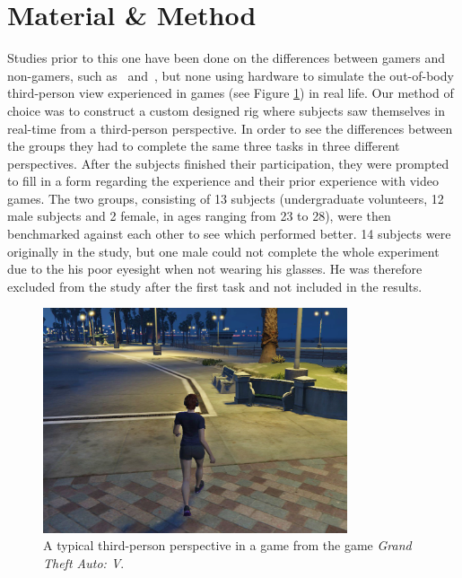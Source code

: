 \documentclass[runningheads,a4paper,oribibl]{llncs}
\begin{document}

\section{Material \& Method}
Studies prior to this one have been done on the differences between gamers and non-gamers, such as~\cite{schmierbach2011exploring} and~\cite{gong2015enhanced}, but none using hardware to simulate the out-of-body third-person view experienced in games (see Figure \ref{fig:GTAIV}) in real life. Our method of choice was to construct a custom designed rig where subjects saw themselves in real-time from a third-person perspective. In order to see the differences between the groups they had to complete the same three tasks in three different perspectives. After the subjects finished their participation, they were prompted to fill in a form regarding the experience and their prior experience with video games. The two groups, consisting of 13 subjects (undergraduate volunteers, 12 male subjects and 2 female, in ages ranging from 23 to 28), were then benchmarked against each other to see which performed better. 14 subjects were originally in the study, but one male could not complete the whole experiment due to the his poor eyesight when not wearing his glasses. He was therefore excluded from the study after the first task and not included in the results.




\begin{figure}
   \centering
   \includegraphics[width=0.8\textwidth]{ExternalMaterial/GTA}
   \caption{A typical third-person perspective in a game from the game \emph{Grand Theft Auto: V}. \label{fig:GTAIV}}
\end{figure}
\end{document}
